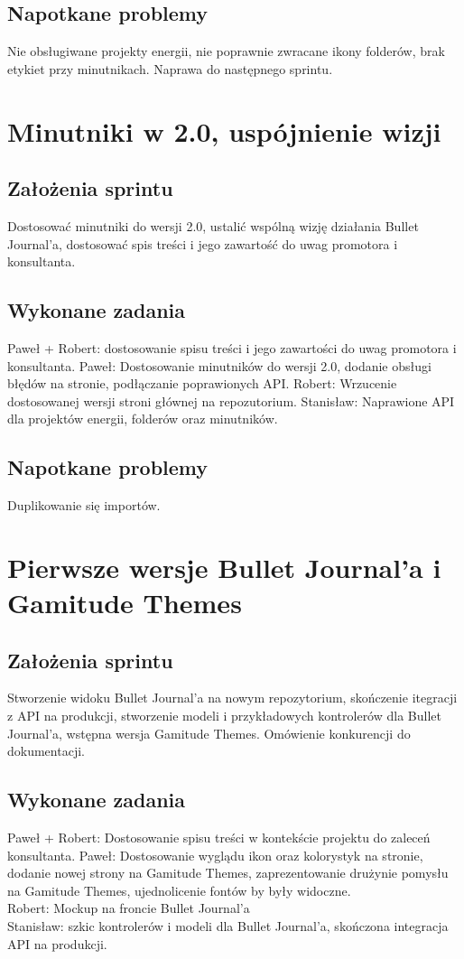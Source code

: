 \documentclass[a4paper,11pt]{report}
\begin{document}
\subsection {Napotkane problemy}
Nie obsługiwane projekty energii, nie poprawnie zwracane ikony folderów, brak etykiet przy minutnikach. Naprawa do następnego sprintu.

\section {Minutniki w 2.0, uspójnienie wizji}
\subsection {Założenia sprintu}
Dostosować minutniki do wersji 2.0, ustalić wspólną wizję działania Bullet Journal'a, dostosować spis treści i jego zawartość do uwag promotora i konsultanta.
\subsection {Wykonane zadania}
Paweł + Robert: dostosowanie spisu treści i jego zawartości do uwag promotora i konsultanta.
Paweł: Dostosowanie minutników do wersji 2.0, dodanie obsługi błędów na stronie, podłączanie poprawionych API.
Robert:  Wrzucenie dostosowanej wersji stroni głównej na repozutorium.
Stanisław: Naprawione API dla projektów energii, folderów oraz minutników.
\subsection {Napotkane problemy}
Duplikowanie się importów.

\section {Pierwsze wersje Bullet Journal'a i Gamitude Themes}
\subsection {Założenia sprintu}
Stworzenie widoku Bullet Journal'a na nowym repozytorium, skończenie itegracji z API na produkcji, stworzenie modeli i przykładowych kontrolerów dla Bullet Journal'a, wstępna wersja Gamitude Themes. Omówienie konkurencji do dokumentacji.
\subsection {Wykonane zadania}
Paweł + Robert: Dostosowanie spisu treści w kontekście projektu do zaleceń konsultanta.
Paweł: Dostosowanie wyglądu ikon oraz kolorystyk na stronie, dodanie nowej strony na Gamitude Themes, zaprezentowanie drużynie pomysłu na Gamitude Themes, ujednolicenie fontów by były widoczne.
\\Robert: Mockup na froncie Bullet Journal'a
\\Stanisław: szkic kontrolerów i modeli dla Bullet Journal'a, skończona integracja API na produkcji.
\end{document}

